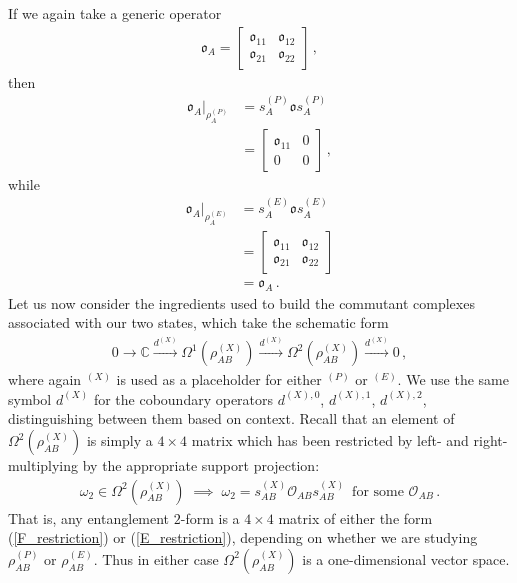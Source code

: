 \documentclass[12pt]{article}
\numberwithin{equation}{section}
\begin{document}
If we again take a generic operator
%
\begin{align}
    \mathfrak{o}_A = \begin{bmatrix} \mathfrak{o}_{11} & \mathfrak{o}_{12} \\ \mathfrak{o}_{21} & \mathfrak{o}_{22} \end{bmatrix} \, ,
\end{align}
%
then
%
\begin{align}
    \mathfrak{o}_A \big\vert_{\rho_A^{(P)}} &= s_A^{(P)} \mathfrak{o} s_A^{(P)} \nonumber \\
    &= \begin{bmatrix} \mathfrak{o}_{11} & 0 \\ 0 & 0 \end{bmatrix} \, ,
\end{align}
%
while
%
\begin{align}
    \mathfrak{o}_A \big\vert_{\rho_A^{(E)}} &= s_A^{(E)} \mathfrak{o} s_A^{(E)} \nonumber \\
    &= \begin{bmatrix} \mathfrak{o}_{11} & \mathfrak{o}_{12} \\ \mathfrak{o}_{21} & \mathfrak{o}_{22} \end{bmatrix} \nonumber \\
    &= \mathfrak{o}_A \, .
\end{align}
%
Let us now consider the ingredients used to build the commutant complexes associated with our two states, which take the schematic form
%
\begin{align}
    0 \to \mathbb{C} \xrightarrow{d^{(X)}} \Omega^1 ( \rho_{AB}^{(X)} ) \xrightarrow{d^{(X)}} \Omega^2 ( \rho_{AB}^{(X)} ) \xrightarrow{d^{(X)}} 0 \, ,
\end{align}
%
where again ${}^{(X)}$ is used as a placeholder for either ${}^{(P)}$ or ${}^{(E)}$. We use the same symbol $d^{(X)}$ for the coboundary operators $d^{(X), 0}$, $d^{(X), 1}$, $d^{(X), 2}$, distinguishing between them based on context. Recall that an element of $\Omega^2 ( \rho_{AB}^{(X)} )$ is simply a $4 \times 4$ matrix which has been restricted by left- and right-multiplying by the appropriate support projection:
%
\begin{align}
    \omega_2 \in \Omega^2 ( \rho_{AB}^{(X)} ) \; \implies \; \omega_2 = s_{AB}^{(X)} \mathcal{O}_{AB} s_{AB}^{(X)} \, \text{ for some } \mathcal{O}_{AB} \, .
\end{align}
%
That is, any entanglement $2$-form is a $4 \times 4$ matrix of either the form (\ref{F_restriction}) or (\ref{E_restriction}), depending on whether we are studying $\rho_{AB}^{(P)}$ or $\rho_{AB}^{(E)}$. Thus in either case $\Omega^2 ( \rho_{AB}^{(X)} )$ is a one-dimensional vector space.
\end{document}
